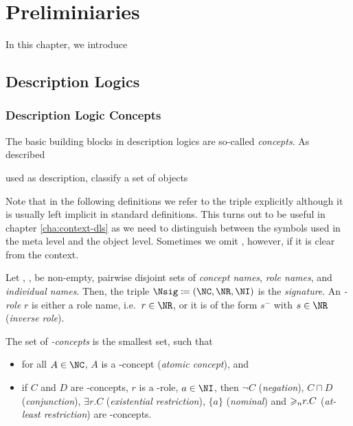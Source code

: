 
\chapter{Preliminiaries}
\label{cha:preliminiaries}

In this chapter, we introduce 



\section{Description Logics}
\label{sec:description-logics}


\subsection{Description Logic Concepts}
\label{sec:dl-concepts}


The basic building blocks in description logics are so-called \emph{concepts}. As described

used as description, classify a set of objects

Note that in the following definitions we refer to the triple \Nsig explicitly although it is
usually left implicit in standard definitions.  This turns out to be useful in chapter
\ref{cha:context-dls} as we need to distinguish between the symbols used in the meta level and the
object level.  Sometimes we omit \Nsig, however, if it is clear from the context.
%

\begin{definition}
  \label{def:syntax-concepts}
  Let \NC, \NR, \NI be non-empty, pairwise disjoint sets of \emph{concept names}, \emph{role names},
  and \emph{individual names}. Then, the triple $\Nsig\coloneqq(\NC,\NR,\NI)$ is the
  \emph{signature}. An \emph{\Nsig-role} $r$ is either a role name, i.e.~$r\in\NR$, or it is of the
  form $s^{-}$ with $s\in\NR$ (\emph{inverse role}).

  The set of \emph{\Nsig-concepts} is the smallest set, such that
  \begin{itemize}
  \item for all $A\in\NC$, $A$ is a \Nsig-concept (\emph{atomic concept}), and
  \item if $C$ and $D$ are \Nsig-concepts, $r$ is a \Nsig-role, $a\in\NI$, then $\lnot C$ (\emph{negation}),
    $C\sqcap D$ (\emph{conjunction}), $\exists r.C$ (\emph{existential restriction}), $\{a\}$
    (\emph{nominal}) and ${\geqslant_{n}}r.C$ (\emph{at-least restriction}) are \Nsig-concepts. \qedhere
  \end{itemize}
\end{definition}

